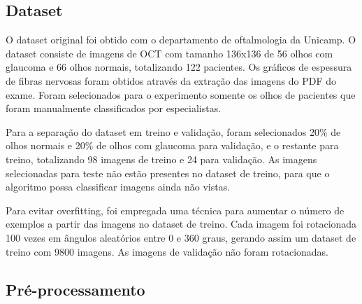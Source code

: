 \documentclass[conference]{IEEEtran}
\begin{document}


  \subsection{Dataset}


  O dataset original foi obtido com o departamento de oftalmologia da Unicamp. O dataset consiste de imagens de OCT com tamanho 136x136 de 56 olhos com glaucoma e 66 olhos normais, totalizando 122 pacientes. Os gráficos de espessura de fibras nervosas foram obtidos através da extração das imagens do PDF do exame. Foram selecionados para o experimento somente os olhos de pacientes que foram manualmente classificados por especialistas.

  Para a separação do dataset em treino e validação, foram selecionados 20\% de olhos normais e 20\% de olhos com glaucoma para validação, e o restante para treino, totalizando 98 imagens de treino e 24 para validação. As imagens selecionadas para teste não estão presentes no dataset de treino, para que o algoritmo possa classificar imagens ainda não vistas.

  Para evitar overfitting, foi empregada uma técnica para aumentar o número de exemplos a partir das imagens no dataset de treino. Cada imagem foi rotacionada 100 vezes em ângulos aleatórios entre 0 e 360 graus, gerando assim um dataset de treino com 9800 imagens. As imagens de validação não foram rotacionadas.

  \subsection{Pré-processamento}
\end{document}
